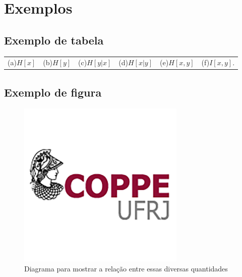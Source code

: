 \section{Exemplos}

\subsection{Exemplo de tabela}
\begin{center}
    \begin{tabular}{c c c c c c}
     (a)$H[x]$ & (b)$H[y]$ & (c)$H[y|x]$ & (d)$H[x|y]$ & (e)$H[x,y]$ & (f)$I[x,y]$. \\
    \end{tabular}
\end{center}

\subsection{Exemplo de figura}
\begin{figure}[H]
    \caption{Diagrama para mostrar a relação entre essas diversas quantidades}
       \centering
       \includegraphics[height=8cm]{COPPE UFRJ.png}
\end{figure}